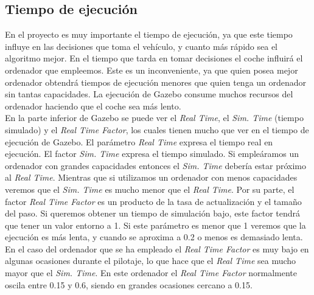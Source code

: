 \subsection{Tiempo de ejecución}

En el proyecto es muy importante el tiempo de ejecución, ya que este tiempo influye en las decisiones que toma el vehículo, y cuanto más rápido sea el algoritmo mejor. En el tiempo que tarda en tomar decisiones el coche influirá el ordenador que empleemos. Este es un inconveniente, ya que quien posea mejor ordenador obtendrá tiempos de ejecución menores que quien tenga un ordenador sin tantas capacidades. La ejecución de Gazebo consume muchos recursos del ordenador haciendo que el coche sea más lento.\\

En la parte inferior de Gazebo se puede ver el \textit{Real Time}, el \textit{Sim. Time} (tiempo simulado) y el \textit{Real Time Factor}, los cuales tienen mucho que ver en el tiempo de ejecución de Gazebo. El parámetro \textit{Real Time} expresa el tiempo real en ejecución. El factor \textit{Sim. Time} expresa el tiempo simulado. Si empleáramos un ordenador con grandes capacidades entonces el \textit{Sim. Time} debería estar próximo al \textit{Real Time}. Mientras que si utilizamos un ordenador con menos capacidades veremos que el \textit{Sim. Time} es mucho menor que el \textit{Real Time}. Por su parte, el factor \textit{Real Time Factor} es un producto de la tasa de actualización y el tamaño del paso. Si queremos obtener un tiempo de simulación bajo, este factor tendrá que tener un valor entorno a 1. Si este parámetro es menor que 1 veremos que la ejecución es más lenta, y cuando se aproxima a 0.2 o menos es demasiado lenta.\\

En el caso del ordenador que se ha empleado el \textit{Real Time Factor} es muy bajo en algunas ocasiones durante el pilotaje, lo que hace que el \textit{Real Time} sea mucho mayor que el \textit{Sim. Time}. En este ordenador el \textit{Real Time Factor} normalmente oscila entre 0.15 y 0.6, siendo en grandes ocasiones cercano a 0.15.
